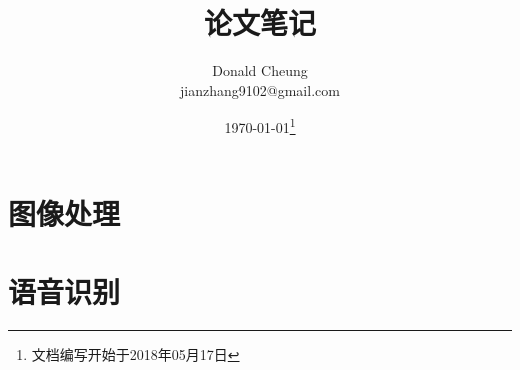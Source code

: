 \def\papersnotes{}
\ifx\notes\undefined
    \providecommand{\notesroot}{..}
    \providecommand{\papersroot}{.}

    \title{论文笔记}
    \author{Donald Cheung\\jianzhang9102@gmail.com}
    \date{\today\footnote{文档编写开始于2018年05月17日}}

    
\else
    \providecommand{\papersroot}{\notesroot/papers}
\fi



\chapter{图像处理}

\chapter{语音识别}

\ifx\notes\undefined
    
\fi
